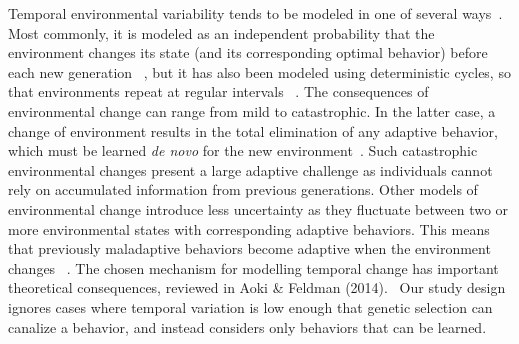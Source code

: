 \documentclass[letterpaper,11.5pt]{scrartcl}
\begin{document}
Temporal environmental variability tends to be modeled in one of 
several ways~\cite{aoki2014evolution}. Most commonly, it is modeled
as an independent probability that the environment changes its state (and its corresponding optimal behavior) before each new generation
~\cite{BoydRicherson1985,Rogers1988,Feldman1996,McElreath2005,Enquist2007,perreault2012bayesian,aoki2014evolution}, but
it has also been modeled using deterministic cycles, so that environments repeat at regular intervals ~\cite{Feldman1996, aoki2014evolution}.
The consequences of environmental change can range from mild to
catastrophic. In the latter case, a change of environment results in the total
elimination of any adaptive behavior, which must be learned \emph{de novo} for the
new environment~\cite{Rogers1988}. Such catastrophic environmental changes present
a large adaptive challenge as individuals cannot rely on accumulated information
from previous generations. Other models of environmental change introduce less
uncertainty as they fluctuate between two or more environmental states with corresponding
adaptive behaviors. This means that previously maladaptive
behaviors become adaptive when the environment changes
~\cite{perreault2012bayesian}. The chosen mechanism for modelling temporal
change has important theoretical consequences, reviewed in Aoki \& Feldman (2014).~\nocite{aoki2014evolution} Our study design ignores cases where temporal variation is low enough that genetic selection can canalize a behavior, and instead considers only behaviors that can be learned. 
\end{document}
